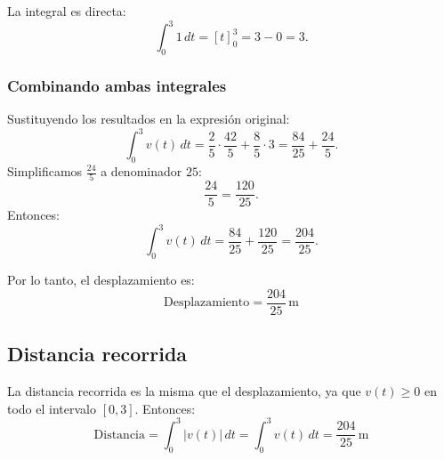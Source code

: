 La integral es directa:
\[
\int_{0}^{3} 1 \, dt = \left[ t \right]_{0}^{3} = 3 - 0 = 3.
\]

\subsubsection*{Combinando ambas integrales}

Sustituyendo los resultados en la expresión original:
\[
\int_{0}^{3} v(t) \, dt = \frac{2}{5} \cdot \frac{42}{5} + \frac{8}{5} \cdot 3 = \frac{84}{25} + \frac{24}{5}.
\]
Simplificamos \( \frac{24}{5} \) a denominador \( 25 \):
\[
\frac{24}{5} = \frac{120}{25}.
\]
Entonces:
\[
\int_{0}^{3} v(t) \, dt = \frac{84}{25} + \frac{120}{25} = \frac{204}{25}.
\]

Por lo tanto, el desplazamiento es:
\[\boxed{
\text{Desplazamiento} = \frac{204}{25} \, \text{m}}
\]

\subsection*{Distancia recorrida}

La distancia recorrida es la misma que el desplazamiento, ya que \( v(t) \geq 0 \) en todo el intervalo \( [0, 3] \). Entonces:
\[
\text{Distancia} = \int_{0}^{3} |v(t)| \, dt = \int_{0}^{3} v(t) \, dt = \boxed{ \frac{204}{25} \, \text{m}}
\]
